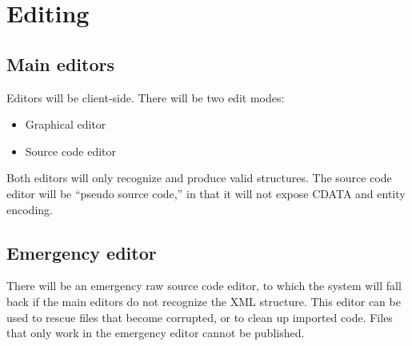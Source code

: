 \section{Editing}
\subsection{Main editors}
Editors will be client-side. There will be two edit modes:
\begin{itemize}
\item Graphical editor
\item Source code editor
\end{itemize}
Both editors will only recognize and produce valid structures. The source code editor will be ``pseudo source code,'' in that it will not expose CDATA and entity encoding.
\subsection{Emergency editor}
There will be an emergency raw source code editor, to which the system will fall back if the main editors do not recognize the XML structure. This editor can be used to rescue files that become corrupted, or to clean up imported code. Files that only work in the emergency editor cannot be published.
